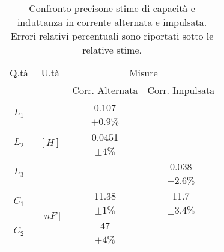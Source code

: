 \begin{table}[H]
\begin{center}
\begin{tabular}{|c|c|c|c|}
\hline

 
Q.tà & U.tà  & \multicolumn{2}{|c|}{Misure}  \\
\multicolumn{2}{|c|}{}  
& Corr. Alternata & Corr. Impulsata \\\hline

\multirow{2}{*}{$L_{1}$} 
& \multirow{6}{*}{$[H]$}
& 0.107        &   \\
&
& $\pm 0.9\%$  &   \\

\multirow{2}{*}{$L_{2}$}
& 
&  0.0451        &   \\
&
&  $\pm 4\%$  &   \\

\multirow{2}{*}{$L_{3}$} 
&
&         &  0.038 \\
&
&         & $\pm 2.6\%$   \\\hline


\multirow{2}{*}{$C_{1}$} 
&  \multirow{4}{*}{$[nF]$}
& 11.38       & 11.7  \\
& 
& $\pm 1\%$  &  $\pm 3.4\%$   \\

\multirow{2}{*}{$C_{2}$} 
&  
& 47  &   \\
&
& $\pm 4\%$  &   \\\hline

\hline
\end{tabular}
\end{center}

\caption{Confronto precisone stime di capacità e induttanza in corrente alternata e impulsata. Errori relativi percentuali sono riportati sotto le relative stime.}
\label{C3_finale}

\end{table}

